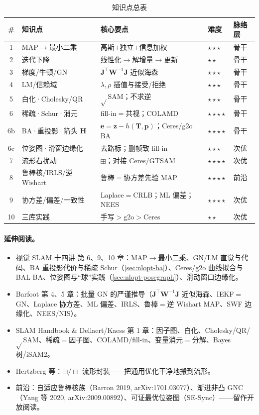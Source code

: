 \begin{table}[H]\centering\small
\caption{知识点总表}
\begin{tabular}{cllll}
\toprule
\# & 知识点 & 核心要点 & 难度 & 脉络层 \\
\midrule
1 & MAP$\to$最小二乘 & 高斯$+$独立$+$信息加权 & \(\star\star\star\) & 骨干 \\
2 & 迭代下降 & 线性化$\to$解增量$\to$更新 & \(\star\star\) & 骨干 \\
3 & 梯度/牛顿/GN & $\mathbf{J}^\top\mathbf{W}^{-1}\mathbf{J}$ 近似海森 & \(\star\star\star\) & 骨干 \\
4 & LM/信赖域 & $\lambda,\rho$ 插值与接受/拒绝 & \(\star\star\star\) & 骨干 \\
5 & 白化·Cholesky/QR & $\sqrt{}$SAM；不求逆 & \(\star\star\star\) & 骨干 \\
6 & 稀疏·Schur·消元 & fill-in$=$共视；COLAMD & \(\star\star\star\star\) & 骨干 \\
6b & BA·重投影·箭头 $\mathbf{H}$ & $\mathbf{e}=\mathbf{z}-h(\mathbf{T},\mathbf{p})$；Ceres/g2o BA & \(\star\star\star\star\) & 骨干 \\
6c & 位姿图·滑窗边缘化 & 去路标；删帧致 fill-in & \(\star\star\star\) & 次优 \\
7 & 流形右扰动 & $\boxplus$；对接 Ceres/GTSAM & \(\star\star\star\star\) & 次优 \\
8 & 鲁棒核/IRLS/逆 Wishart & 鲁棒$=$协方差先验 MAP & \(\star\star\star\star\) & 前沿 \\
9 & 协方差/偏差/一致性 & Laplace$=$CRLB；ML 偏差；NEES & \(\star\star\star\star\) & 次优 \\
10 & 三库实践 & 手写$>$g2o$>$Ceres & \(\star\star\) & 次优 \\
\bottomrule
\end{tabular}
\end{table}

\paragraph{延伸阅读。}
\begin{itemize}
  \item 视觉 SLAM 十四讲\cite{gaoxiang2019slam14} 第 6、9、10 章：MAP$\to$最小二乘、GN/LM 直觉与代码、BA 重投影代价与稀疏 Schur（\cref{sec:nlopt-ba}）、Ceres/g2o 曲线拟合与 BAL BA、位姿图与“球”实践（\cref{sec:nlopt-posegraph}）、滑动窗口边缘化。
  \item Barfoot\cite{barfoot2024state} 第 4、5 章：批量 GN 的严谨推导（$\mathbf{J}^\top\mathbf{W}^{-1}\mathbf{J}$ 近似海森、IEKF$=$GN、Laplace 协方差、ML 偏差、IRLS、鲁棒$=$逆 Wishart MAP、SWF 边缘化、NEES/NIS）。
  \item SLAM Handbook\cite{carlone2026handbook} \& Dellaert/Kaess\cite{dellaert2017factor} 第 1 章：因子图、白化、Cholesky/QR/$\sqrt{}$SAM、稀疏$=$因子图、COLAMD/fill-in、变量消元$=$分解、Bayes 树/iSAM2。
  \item Hertzberg 等\cite{hertzberg2013integrating}：$\boxplus/\boxminus$ 流形封装——把通用优化干净地搬到流形。
  \item 前沿：自适应鲁棒核族（Barron 2019, arXiv:1701.03077）、渐进非凸 GNC（Yang 等 2020, arXiv:2009.00892）、可证最优位姿图（SE-Sync）——留作开放阅读。
\end{itemize}

